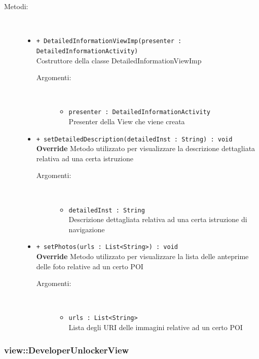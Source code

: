 \documentclass[../DefinizioneDiProdotto.tex]{subfiles}
\begin{document}
\begin{description}
\begin{itemize}
\end{itemize}
\item[Metodi:] \
\begin{itemize}
\item \texttt{+ DetailedInformationViewImp(presenter : DetailedInformationActivity)}\\
Costruttore della classe DetailedInformationViewImp
 \begin{description}
\item[Argomenti:] \
\begin{itemize}
\item \texttt{presenter : DetailedInformationActivity}\\
Presenter della View che viene creata\end{itemize}
\end{description}
\item \texttt{+ setDetailedDescription(detailedInst : String) : void}\\
\textbf{Override} Metodo utilizzato per visualizzare la descrizione dettagliata relativa ad una certa istruzione
 \begin{description}
\item[Argomenti:] \
\begin{itemize}
\item \texttt{detailedInst : String}\\
Descrizione dettagliata relativa ad una certa istruzione di navigazione\end{itemize}
\end{description}
\item \texttt{+ setPhotos(urls : List<String>) : void}\\
\textbf{Override} Metodo utilizzato per visualizzare la lista delle anteprime delle foto relative ad un certo POI
 \begin{description}
\item[Argomenti:] \
\begin{itemize}
\item \texttt{urls : List<String>}\\
Lista degli URI delle immagini relative ad un certo POI\end{itemize}
\end{description}
\end{itemize}
\end{description}

\subsubsection{view::DeveloperUnlockerView}
\end{document}
